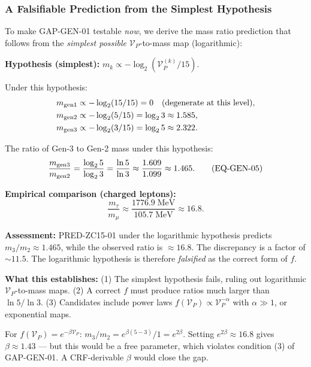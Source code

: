 \documentclass[12pt, a4paper]{article}
\begin{document}
\subsubsection{A Falsifiable Prediction from the Simplest Hypothesis}

To make GAP-GEN-01 testable \emph{now}, we derive the mass
ratio prediction that follows from the \emph{simplest possible}
$\mathcal{V}_P$-to-mass map (logarithmic):

\begin{formalbox}[title={PRED-ZC15-01: Logarithmic Possibility-Mass
  Prediction (Falsifiable)}]
\label{zc15:pred:mass-ratio}
\textbf{Hypothesis (simplest):}
$m_k \propto -\log_2(\mathcal{V}_P^{(k)}/15)$.

Under this hypothesis:
\begin{align}
  m_{\rm gen1} &\propto -\log_2(15/15) = 0
  \quad\text{(degenerate at this level)},\notag\\
  m_{\rm gen2} &\propto -\log_2(5/15) = \log_2 3
  \approx 1.585,\notag\\
  m_{\rm gen3} &\propto -\log_2(3/15) = \log_2 5
  \approx 2.322.\notag
\end{align}

The ratio of Gen-3 to Gen-2 mass under this hypothesis:
\begin{equation}
  \frac{m_{\rm gen3}}{m_{\rm gen2}}
  = \frac{\log_2 5}{\log_2 3}
  = \frac{\ln 5}{\ln 3}
  \approx \frac{1.609}{1.099}
  \approx 1.465.
  \tag{EQ-GEN-05}\label{zc15:eq:pred-mass-ratio}
\end{equation}

\textbf{Empirical comparison (charged leptons):}
\[
  \frac{m_\tau}{m_\mu} \approx \frac{1776.9\;\text{MeV}}{105.7\;\text{MeV}} \approx 16.8.
\]

\textbf{Assessment:} PRED-ZC15-01 under the logarithmic
hypothesis predicts $m_3/m_2 \approx 1.465$, while the
observed ratio is $\approx 16.8$. The discrepancy is a factor
of $\sim 11.5$. The logarithmic hypothesis is therefore
\emph{falsified} as the correct form of $f$.

\textbf{What this establishes:} (1) The simplest hypothesis
fails, ruling out logarithmic $\mathcal{V}_P$-to-mass maps.
(2) A correct $f$ must produce ratios much larger than
$\ln 5/\ln 3$. (3) Candidates include power laws
$f(\mathcal{V}_P) \propto \mathcal{V}_P^{-\alpha}$ with
$\alpha \gg 1$, or exponential maps.

For $f(\mathcal{V}_P) = e^{-\beta \mathcal{V}_P}$:
$m_3/m_2 = e^{\beta(5-3)}/1 = e^{2\beta}$. Setting
$e^{2\beta} \approx 16.8$ gives $\beta \approx 1.43$ ---
but this would be a free parameter, which violates condition (3)
of GAP-GEN-01. A CRF-derivable $\beta$ would close the gap.
\end{formalbox}
\end{document}

